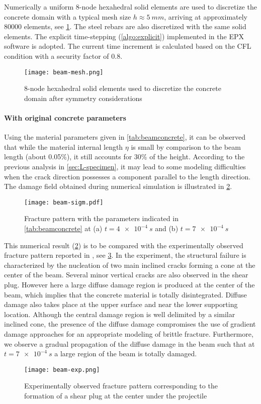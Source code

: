 Numerically a uniform 8-node hexahedral solid elements are used to discretize the concrete domain with a typical mesh size $h\approx\SI{5}{mm}$, arriving at approximately \num{80000} elements, see \cref{fig:beammesh}. The steel rebars are also discretized with the same solid elements. The explicit time-stepping (\cref{algo:explicit}) implemented in the EPX software is adopted. The current time increment is calculated based on the CFL condition with a security factor of 0.8.
\begin{figure}[htbp]
\centering
\texttt{[image: beam-mesh.png]}
\caption{8-node hexahedral solid elements used to discretize the concrete domain after symmetry considerations} \label{fig:beammesh}
\end{figure}

\paragraph{With original concrete parameters} Using the material parameters given in \cref{tab:beamconcrete}, it can be observed that while the material internal length $\eta$ is small by comparison to the beam length (about 0.05\%), it still accounts for 30\% of the height. According to the previous analysis in \cref{sec:L-specimen}, it may lead to some modeling difficulties when the crack direction possesses a component parallel to the length direction. The damage field obtained during numerical simulation is illustrated in \cref{fig:beamsigm}.
\begin{figure}[htbp]
\centering
\texttt{[image: beam-sigm.pdf]}
\caption{Fracture pattern with the parameters indicated in \cref{tab:beamconcrete} at (a) $t=\SI{4e-4}{s}$ and (b) $t=\SI{7e-4}{s}$} \label{fig:beamsigm}
\end{figure}

This numerical result (\cref{fig:beamsigm}) is to be compared with the experimentally observed fracture pattern reported in \cite{Guilbaud:2015}, see \cref{fig:beamexp}. In the experiment, the structural failure is characterized by the nucleation of two main inclined cracks forming a cone at the center of the beam. Several minor vertical cracks are also observed in the shear plug. However here a large diffuse damage region is produced at the center of the beam, which implies that the concrete material is totally disintegrated. Diffuse damage also takes place at the upper surface and near the lower supporting location. Although the central damage region is well delimited by a similar inclined cone, the presence of the diffuse damage compromises the use of gradient damage approaches for an appropriate modeling of brittle fracture. Furthermore, we observe a gradual propagation of the diffuse damage in the beam such that at $t=\SI{7e-4}{s}$ a large region of the beam is totally damaged.
\begin{figure}[htbp]
\centering
\texttt{[image: beam-exp.png]}
\caption{Experimentally observed fracture pattern corresponding to the formation of a shear plug at the center under the projectile} \label{fig:beamexp}
\end{figure}

